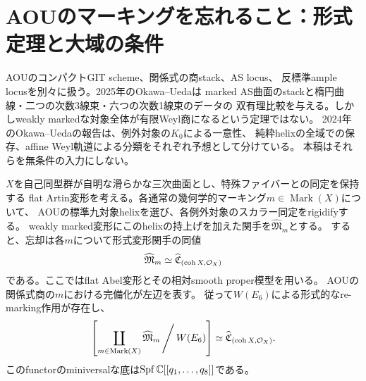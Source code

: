 \section{AOUのマーキングを忘れること：形式定理と大域の条件}\label{sec:weyl}
AOUのコンパクトGIT scheme、関係式の商stack、AS locus、
反標準ample locusを別々に扱う。2025年のOkawa--Ueda\cite[Theorem 6.4]{OU2025}は
marked AS曲面のstackと楕円曲線・二つの次数3線束・六つの次数1線束のデータの
双有理比較を与える。しかしweakly markedな対象全体が有限Weyl商になるという定理ではない。
2024年のOkawa--Uedaの報告\cite{OWR}は、例外対象の$K_0$による一意性、
純粋helixの全域での保存、affine Weyl軌道による分類をそれぞれ予想として分けている。
本稿はそれらを無条件の入力にしない。

\begin{theorem}[可換点での形式Weyl商]\label{thm:formal-weyl}
$X$を自己同型群が自明な滑らかな三次曲面とし、特殊ファイバーとの同定を保持する
flat Artin変形を考える。各通常の幾何学的マーキング$m\in\operatorname{Mark}(X)$について、
AOUの標準九対象helixを選び、各例外対象のスカラー同定をrigidifyする。
weakly marked変形にこのhelixの持上げを加えた関手を$\widehat{\mathfrak M}_m$とする。
すると、忘却は各$m$について形式変形関手の同値
\[
 \widehat{\mathfrak M}_m\simeq
 \widehat{\mathfrak C}_{(\operatorname{coh}X,\mathcal O_X)}
\]
である。ここではflat Abel変形とその相対smooth proper模型を用いる。
AOUの関係式商の$m$における完備化が左辺を表す。
従って$W(E_6)$による形式的なre-marking作用が存在し、
\begin{equation}\label{eq:formal-weyl}
 \left[\coprod_{m\in\operatorname{Mark}(X)}\widehat{\mathfrak M}_m
       \,\middle/\,W(E_6)\right]
 \simeq\widehat{\mathfrak C}_{(\operatorname{coh}X,\mathcal O_X)}.
\end{equation}
このfunctorのminiversalな底は$\operatorname{Spf}\mathbb C[[q_1,\ldots,q_8]]$である。
\end{theorem}
